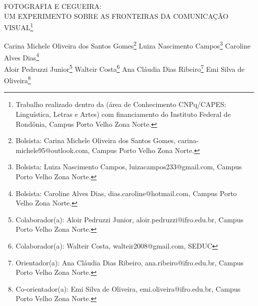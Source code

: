 \documentclass[article,12pt,onesidea,4paper,english,brazil]{abntex2}
\begin{document}
	
	
	\frenchspacing 
	
	\begin{center}
		\LARGE FOTOGRAFIA E CEGUEIRA: \\UM EXPERIMENTO SOBRE AS FRONTEIRAS DA COMUNICAÇÃO VISUAL\footnote{Trabalho realizado dentro da (área de Conhecimento CNPq/CAPES: Linguística, Letras e Artes) com financiamento do Instituto Federal de Rondônia, Campus Porto Velho Zona Norte.}
		
		\normalsize
		Carina Michele Oliveira dos Santos Gomes\footnote{Bolsista: Carina Michele Oliveira dos Santos Gomes, carina-michele95@outlook.com, Campus Porto Velho Zona Norte.} 
		Luiza Nascimento Campos\footnote{Bolsista: Luiza Nascimento Campos, luizacampos233@gmail.com, Campus Porto Velho Zona Norte.} 
		Caroline Alves Dias\footnote{Bolsista: Caroline Alves Dias, dias.caroline@hotmail.com, Campus Porto Velho Zona Norte.} \\
		Aloir Pedruzzi Junior\footnote{Colaborador(a): Aloir Pedruzzi Junior, aloir.pedruzzi@ifro.edu.br, Campus Porto Velho Zona Norte.}
		Walteir Costa\footnote{Colaborador(a): Walteir Costa, walteir2008@gmail.com, SEDUC }
		Ana Cláudia Dias Ribeiro\footnote{Orientador(a): Ana Cláudia Dias Ribeiro, ana.ribeiro@ifro.edu.br, Campus Porto Velho Zona Norte.}
		Emi Silva de Oliveira\footnote{Co-orientador(a): Emi Silva de Oliveira, emi.oliveira@ifro.edu.br, Campus Porto Velho Zona Norte.} 
	\end{center}
	
\end{document}
